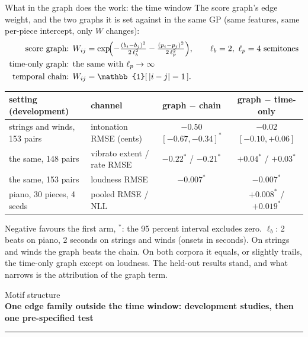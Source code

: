 \documentclass[aspectratio=169,11pt]{beamer}
\newcommand{\divider}[2]{\begin{frame}\centering\vfill
  {\small\textcolor{muted}{#1}}\\[2mm]
  {\LARGE\textbf{#2}}\\[4mm]
  {\color{okblue}\rule{62mm}{1.2pt}}\vfill\end{frame}}
\begin{document}
\begin{frame}{What in the graph does the work: the time window}
  The score graph's edge weight, and the two graphs it is set against
  in the same GP (same features, same per-piece intercept, only $W$
  changes):
  \vspace{-1mm}
  \begin{align*}
    \text{score graph: }& W_{ij} = \exp\!\Bigl( -\tfrac{(b_i - b_j)^2}{2\,\ell_b^2}
                          -\tfrac{(p_i - p_j)^2}{2\,\ell_p^2} \Bigr),\qquad
    \ell_b = 2,\ \ell_p = 4 \text{ semitones}\\
    \text{time-only graph: }& \text{the same with } \ell_p \to \infty\\
    \text{temporal chain: }& W_{ij} = \mathbb{1}[\,|i-j| = 1\,].
  \end{align*}
  \vspace{-4mm}
  \begin{center}
  \footnotesize
  \setlength{\tabcolsep}{2.5pt}
  \begin{tabular}{@{}llcc@{}}
    \toprule
    setting (development) & channel & graph $-$ chain & graph $-$ time-only \\
    \midrule
    strings and winds, 153 pairs & intonation RMSE (cents) & $-0.50$ $[-0.67,-0.34]^{*}$ & $-0.02$ $[-0.10,+0.06]$ \\
    the same, 148 pairs & vibrato extent / rate RMSE & $-0.22^{*}$ / $-0.21^{*}$ & $+0.04^{*}$ / $+0.03^{*}$ \\
    the same, 153 pairs & loudness RMSE & $-0.007^{*}$ & $-0.007^{*}$ \\
    piano, 30 pieces, 4 seeds & pooled RMSE / NLL & & $+0.008^{*}$ / $+0.019^{*}$ \\
    \bottomrule
  \end{tabular}
  \end{center}
  \vspace{-1mm}
  {\footnotesize Negative favours the first arm, $^{*}$: the 95 percent interval
  excludes zero. $\ell_b$: 2 beats on piano, 2 seconds on strings and
  winds (onsets in seconds). On strings and winds the graph beats the
  chain. On both corpora it equals, or slightly trails, the time-only
  graph except on loudness. The held-out results stand, and what
  narrows is the attribution of the graph term.\par}
\end{frame}

\divider{Motif structure}{One edge family outside the time window: development studies, then one pre-specified test}
\end{document}
